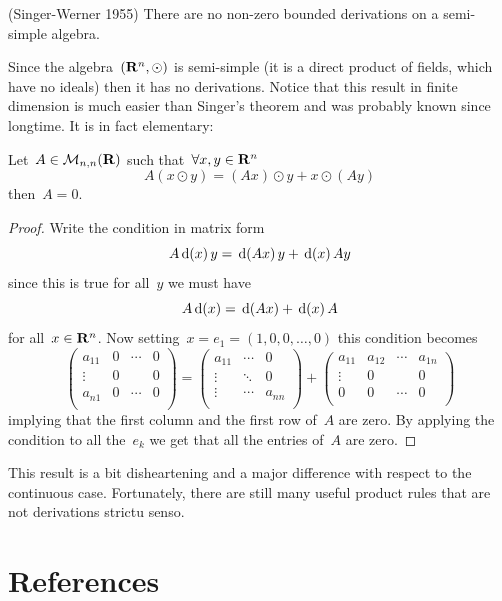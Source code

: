 \begin{theorem}(Singer-Werner 1955)
	There are no non-zero bounded derivations on a semi-simple algebra.
\end{theorem}

Since the algebra~$(\mathbf{R}^n,\odot)$ is semi-simple (it is a direct product of
fields, which have no ideals) then it has no derivations.  Notice that this
result in finite dimension is much easier than Singer's theorem and was
probably known since longtime.  It is in fact elementary:

\begin{proposition}
	Let~$A\in\mathcal{M}_{n,n}(\mathbf{R})$ such that~$\forall x,y\in\mathbf{R}^n$
	\[
		A\left(x\odot y\right)=\left(Ax\right)\odot y+x\odot\left(Ay\right)
	\]
	then~$A=0$.
\end{proposition}
\begin{proof}
	Write the condition in matrix form
	\[
		A\,\mathrm{d}\!\left(x\right)y=\,\mathrm{d}\!\left(Ax\right)y+\,\mathrm{d}\!\left(x\right)Ay
	\]
	since this is true for all~$y$ we must have
	\[
		A\,\mathrm{d}\!\left(x\right)=\,\mathrm{d}\!\left(Ax\right)+\,\mathrm{d}\!\left(x\right)A
	\]
	for all~$x\in\mathbf{R}^n$.  Now setting~$x=e_1=(1,0,0,\ldots,0)$ this condition
	becomes
	\[
		\begin{pmatrix}
			a_{11} & 0 & \cdots & 0 \\
			\vdots & 0 &  & 0 \\
			a_{n1} & 0 & \cdots & 0 \\
		\end{pmatrix}
		=
		\begin{pmatrix}
			a_{11} & \cdots & 0 \\
			\vdots & \ddots &  0 \\
			\vdots & \cdots & a_{nn} \\
		\end{pmatrix}
		+
		\begin{pmatrix}
			a_{11} & a_{12} & \cdots & a_{1n} \\
			\vdots & 0 &  & 0 \\
			0 & 0 & \cdots & 0 \\
		\end{pmatrix}
	\]
	implying that the first column and the first row of~$A$ are zero.  By
	applying the condition to all the~$e_k$ we get that all the entries of~$A$
	are zero.
\end{proof}
This result is a bit disheartening and a major difference with respect to the
continuous case.  Fortunately, there are still many useful product rules that
are not derivations strictu senso.

\section{References}

